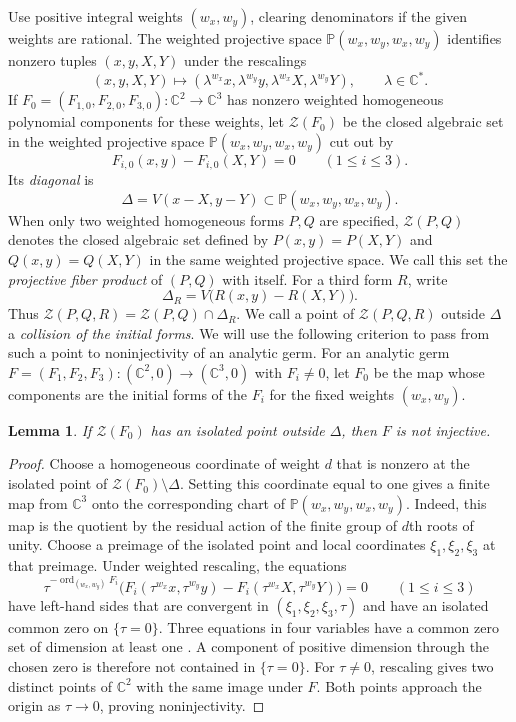 \documentclass[11pt,letterpaper]{article}
\numberwithin{equation}{section}
\newtheorem{lemma}[lemma]{Lemma}
\theoremstyle{remark}
\theoremstyle{plain}
\newcommand{\C}{\mathbb{C}}
\begin{document}
Use positive integral weights $(w_x,w_y)$, clearing denominators
if the given weights are rational.  The weighted projective space
$\mathbb P(w_x,w_y,w_x,w_y)$ identifies nonzero tuples $(x,y,X,Y)$
under the rescalings
\[
 (x,y,X,Y)\longmapsto
 (\lambda^{w_x}x,\lambda^{w_y}y,\lambda^{w_x}X,\lambda^{w_y}Y),
 \qquad \lambda\in\C^*.
\]
If
$F_0=(F_{1,0},F_{2,0},F_{3,0}):\C^2\to\C^3$ has nonzero weighted
homogeneous polynomial components for these weights, let
$\mathcal Z(F_0)$ be the closed algebraic set in the weighted projective space $\mathbb P(w_x,w_y,w_x,w_y)$ cut out by
\[
 F_{i,0}(x,y)-F_{i,0}(X,Y)=0
 \qquad(1\leq i\leq3).
\]
Its \emph{diagonal} is
\[
 \Delta=V(x-X,y-Y)\subset\mathbb P(w_x,w_y,w_x,w_y).
\]
When only two weighted homogeneous forms $P,Q$ are specified,
$\mathcal Z(P,Q)$ denotes the closed algebraic set defined by
$P(x,y)=P(X,Y)$ and $Q(x,y)=Q(X,Y)$ in the same weighted projective
space.  We call this set the \emph{projective fiber product} of
$(P,Q)$ with itself.  For a third form $R$, write
\[
 \Delta_R=V\bigl(R(x,y)-R(X,Y)\bigr).
\]
Thus $\mathcal Z(P,Q,R)=\mathcal Z(P,Q)\cap\Delta_R$.
We call a point of $\mathcal Z(P,Q,R)$ outside $\Delta$ a
\emph{collision of the initial forms}.  We will use the following criterion to pass from such
a point to noninjectivity of an analytic germ.
For an analytic germ $F=(F_1,F_2,F_3):(\C^2,0)\to(\C^3,0)$
with $F_i\neq0$, let $F_0$ be the map whose components are the
initial forms of the $F_i$ for the fixed weights $(w_x,w_y)$.

\begin{lemma}
\label{lem:weighted-lifting}
If $\mathcal Z(F_0)$ has an isolated point outside $\Delta$, then $F$
is not injective.
\end{lemma}

\begin{proof}
Choose a homogeneous coordinate of weight $d$ that is nonzero at the isolated point
of $\mathcal Z(F_0)\setminus\Delta$.  Setting this coordinate equal to
one gives a finite map from $\C^3$ onto the corresponding chart of
$\mathbb P(w_x,w_y,w_x,w_y)$. Indeed, this map is the quotient by the
residual action of the finite group of $d$th roots of unity.
Choose a preimage of the isolated point
and local coordinates $\xi_1,\xi_2,\xi_3$ at that preimage.
Under weighted rescaling, the equations
\[
 \tau^{-\operatorname{ord}_{(w_x,w_y)}F_i}
 \bigl(F_i(\tau^{w_x}x,\tau^{w_y}y)
       -F_i(\tau^{w_x}X,\tau^{w_y}Y)\bigr)=0
 \qquad(1\leq i\leq3)
\]
have left-hand sides that are convergent in
$(\xi_1,\xi_2,\xi_3,\tau)$ and have an isolated common zero on
$\{\tau=0\}$.  Three equations in four
variables have a common zero set of dimension at least one
\cite[Theorem~B.2.1(1)]{GreuelLossenShustin}.  A component of positive dimension through the chosen zero is
therefore not contained in $\{\tau=0\}$.
For $\tau\neq0$, rescaling gives two distinct points of $\C^2$
with the same image under $F$.  Both points approach the origin
as $\tau\to0$, proving noninjectivity.
\end{proof}
\end{document}
